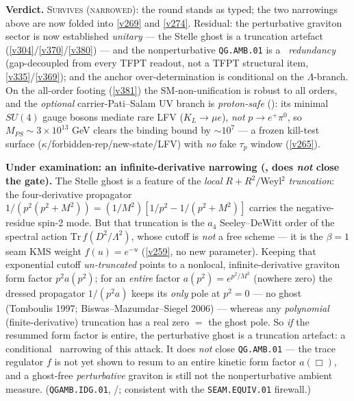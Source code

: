 \documentclass[11pt,a4paper]{article}
\begin{document}
\noindent\textbf{Verdict.} \textsc{Survives (narrowed)}: the round stands as typed; the two narrowings above are
now folded into \vref{v269} and \vref{v274}. Residual: the perturbative graviton sector is now established
\emph{unitary} --- the Stelle ghost is a truncation artefact (\vref{v304}/\vref{v370}/\vref{v380}) --- and the
nonperturbative \texttt{QG.AMB.01} is a \mC\ \emph{redundancy} (gap-decoupled from every TFPT readout, not a TFPT
structural item, \vref{v335}/\vref{v369}); and the anchor over-determination is conditional on the $\Lambda$-branch.
On the all-order footing (\vref{v381}) the SM-non-unification is robust to all orders, and the \emph{optional}
carrier-Pati--Salam UV branch is \emph{proton-safe} (): its minimal $SU(4)$ gauge bosons mediate rare
LFV ($K_L\to\mu e$), \emph{not} $p\to e^+\pi^0$, so $M_{PS}\sim3\times10^{13}$ GeV clears the binding bound by
$\sim10^7$ --- a frozen kill-test surface ($\kappa$/forbidden-rep/new-state/LFV) with \emph{no} fake $\tau_p$
window (\vref{v265}).

\par\smallskip\noindent\textbf{Under examination: an infinite-derivative narrowing (\mC, does \emph{not}
close the gate).} The Stelle ghost is a feature of the \emph{local} $R{+}R^2/$Weyl$^2$ \emph{truncation}:
the four-derivative propagator $1/(p^2(p^2{+}M^2))=(1/M^2)[1/p^2-1/(p^2{+}M^2)]$ carries the
negative-residue spin-2 mode. But that truncation is the $a_4$ Seeley--DeWitt order of the spectral action
$\mathrm{Tr}\,f(D^2/\Lambda^2)$, whose cutoff is \emph{not} a free scheme --- it is the $\beta{=}1$ seam KMS
weight $f(u)=e^{-u}$ (\vref{v259}, no new parameter). Keeping that exponential cutoff \emph{un-truncated}
points to a nonlocal, infinite-derivative graviton form factor $p^2 a(p^2)$; for an \emph{entire} factor
$a(p^2)=e^{p^2/M^2}$ (nowhere zero) the dressed propagator $1/(p^2 a)$ keeps its \emph{only} pole at $p^2{=}0$
--- no ghost (Tomboulis 1997; Biswas--Mazumdar--Siegel 2006) --- whereas any \emph{polynomial}
(finite-derivative) truncation has a real zero $=$ the ghost pole. So \emph{if} the resummed form factor is
entire, the perturbative ghost is a truncation artefact: a conditional \mC\ narrowing of this attack. It does
\emph{not} close \texttt{QG.AMB.01} --- the trace regulator $f$ is not yet shown to resum to an entire kinetic
form factor $a(\Box)$, and a ghost-free \emph{perturbative} graviton is still not the nonperturbative ambient
measure. (\texttt{QGAMB.IDG.01}, \mC/\mO; consistent with the \texttt{SEAM.EQUIV.01} firewall.)
\end{document}
